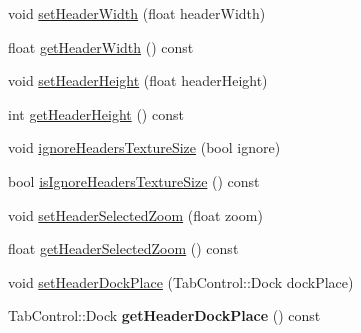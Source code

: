 \begin{DoxyCompactItemize}
\item 
void \hyperlink{classui_1_1TabControl_a684dfc06887f10ff5dddb1085aab7dd4}{set\+Header\+Width} (float header\+Width)
\item 
float \hyperlink{classui_1_1TabControl_a077a40bfe4e7aee4a9026b166c45444e}{get\+Header\+Width} () const
\item 
void \hyperlink{classui_1_1TabControl_af24eae9f0c9d5613ccc4d28a37dc0f3a}{set\+Header\+Height} (float header\+Height)
\item 
int \hyperlink{classui_1_1TabControl_a289b60ebd1c8230753132f7bce2c94aa}{get\+Header\+Height} () const
\item 
void \hyperlink{classui_1_1TabControl_a5f4461d3c00405aedb662eaa5354e5ca}{ignore\+Headers\+Texture\+Size} (bool ignore)
\item 
bool \hyperlink{classui_1_1TabControl_ae5722ba3054173be0943311ee51fcebe}{is\+Ignore\+Headers\+Texture\+Size} () const
\item 
void \hyperlink{classui_1_1TabControl_ade6a8a4e54e5227c9e301fbb37967b96}{set\+Header\+Selected\+Zoom} (float zoom)
\item 
float \hyperlink{classui_1_1TabControl_a0b4d2d945e28d89fb7f071f46b161636}{get\+Header\+Selected\+Zoom} () const
\item 
void \hyperlink{classui_1_1TabControl_afd8f0b327792d7a5a91359c135459b4c}{set\+Header\+Dock\+Place} (Tab\+Control\+::\+Dock dock\+Place)
\item 
\mbox{\label{classui_1_1TabControl_af14da6ed88ba8e3fcdd436267ddc6927}} 
Tab\+Control\+::\+Dock {\bfseries get\+Header\+Dock\+Place} () const
\end{DoxyCompactItemize}

